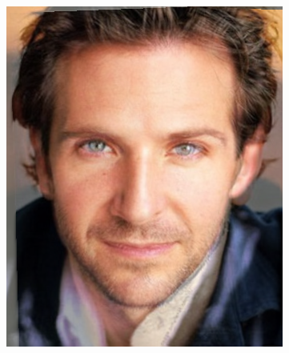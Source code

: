 \documentclass[conference]{IEEEtran}
\begin{document}
\begin{figure}[H]
\begin{multicols}{3}
    \includegraphics[width=1.0\linewidth]{results/faces/B/img30.png} \par
    

\end{multicols}
\end{figure}
\end{document}
